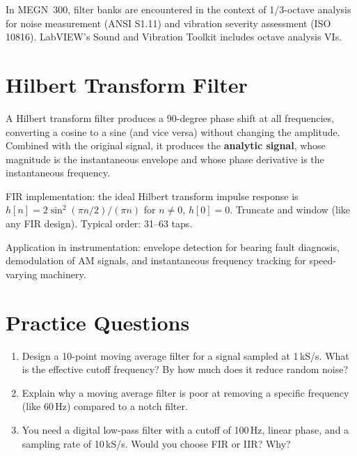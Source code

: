 \documentclass[11pt,letterpaper,twoside,openany]{book}
\begin{document}
In MEGN~300, filter banks are encountered in the context of 1/3-octave analysis for noise measurement (ANSI S1.11) and vibration severity assessment (ISO 10816). LabVIEW's Sound and Vibration Toolkit includes octave analysis VIs.

\section{Hilbert Transform Filter}
A Hilbert transform filter produces a 90-degree phase shift at all frequencies, converting a cosine to a sine (and vice versa) without changing the amplitude. Combined with the original signal, it produces the \textbf{analytic signal}, whose magnitude is the instantaneous envelope and whose phase derivative is the instantaneous frequency.

FIR implementation: the ideal Hilbert transform impulse response is $h[n] = 2\sin^2(\pi n/2)/(\pi n)$ for $n \neq 0$, $h[0] = 0$. Truncate and window (like any FIR design). Typical order: 31--63 taps.

Application in instrumentation: envelope detection for bearing fault diagnosis, demodulation of AM signals, and instantaneous frequency tracking for speed-varying machinery.
\section{Practice Questions}
\begin{enumerate}[leftmargin=1.5em]
\item Design a 10-point moving average filter for a signal sampled at 1\,kS/s. What is the effective cutoff frequency? By how much does it reduce random noise?
\item Explain why a moving average filter is poor at removing a specific frequency (like 60\,Hz) compared to a notch filter.
\item You need a digital low-pass filter with a cutoff of 100\,Hz, linear phase, and a sampling rate of 10\,kS/s. Would you choose FIR or IIR? Why?
\end{enumerate}
\end{document}
